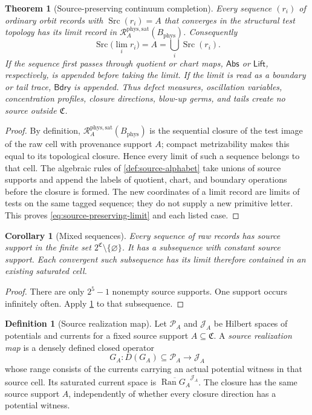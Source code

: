 \documentclass[11pt]{article}
\numberwithin{section}{part}
\theoremstyle{plain}
\newtheorem{theorem}{Theorem}[section]
\newtheorem{corollary}[corollary]{Corollary}
\theoremstyle{definition}
\newtheorem{definition}[definition]{Definition}
\theoremstyle{remark}
\newcommand{\Abs}{\mathsf{Abs}}
\newcommand{\Lift}{\mathsf{Lift}}
\newcommand{\Bdry}{\mathsf{Bdry}}
\newcommand{\Channels}{\mathfrak C}
\newcommand{\Src}{\operatorname{Src}}
\newcommand{\Records}{\mathscr R}
\newcommand{\Phys}{\mathrm{phys}}
\newcommand{\Sat}{\mathrm{sat}}
\newcommand{\Budget}{B_{\Phys}}
\newcommand{\Ran}{\operatorname{Ran}}
\begin{document}
\begin{theorem}[Source-preserving continuum completion]
\label{thm:source-preserving-completion}
Every sequence \((r_i)\) of ordinary orbit records with \(\Src(r_i)=A\) that
converges in the structural test topology has its limit record in
\(\Records_A^{\Phys,\Sat}(\Budget)\).  Consequently
\begin{equation}
 \label{eq:source-preserving-limit}
 \Src\bigl(\lim_i r_i\bigr)
 =A
 =\bigcup_i\Src(r_i).
\end{equation}
If the sequence first passes through quotient or chart maps, \(\Abs\) or
\(\Lift\), respectively, is appended before taking the limit.  If the limit
is read as a boundary or tail trace, \(\Bdry\) is appended.  Thus defect
measures, oscillation variables, concentration profiles, closure directions,
blow-up germs, and tails create no source outside \(\Channels\).
\end{theorem}

\begin{proof}
By definition, \(\Records_A^{\Phys,\Sat}(\Budget)\) is the sequential closure
of the test image of the raw cell with provenance support \(A\); compact
metrizability makes this equal to its topological closure.  Hence every limit
of such a sequence belongs to that cell.  The algebraic rules of
\cref{def:source-alphabet} take unions of source supports and append the
labels of quotient, chart, and boundary operations before the closure is
formed.  The new coordinates of a limit record are limits of tests on the
same tagged sequence; they do not supply a new primitive letter.  This proves
\eqref{eq:source-preserving-limit} and each listed case.
\end{proof}

\begin{corollary}[Mixed sequences]
\label{cor:mixed-source-sequences}
Every sequence of raw records has source support in the finite set
\(2^{\Channels}\setminus\{\varnothing\}\).  It has a subsequence with constant
source support.  Each convergent such subsequence has its limit
therefore contained in an existing saturated cell.
\end{corollary}

\begin{proof}
There are only \(2^5-1\) nonempty source supports.  One support occurs
infinitely often.  Apply \cref{thm:source-preserving-completion} to that
subsequence.
\end{proof}

\begin{definition}[Source realization map]
\label{def:source-realization-map}
Let \(\mathcal P_A\) and \(\mathcal J_A\) be Hilbert spaces of potentials
and currents for a fixed source support \(A\subseteq\Channels\).  A
\emph{source realization map} is a densely defined closed operator
\[
 G_A:D(G_A)\subseteq\mathcal P_A\longrightarrow\mathcal J_A
\]
whose range consists of the currents carrying an actual potential witness in
that source cell.  Its saturated current space is
\(\overline{\Ran G_A}^{\mathcal J_A}\).  The closure has the same source
support \(A\), independently of whether every closure direction has a
potential witness.
\end{definition}
\end{document}
